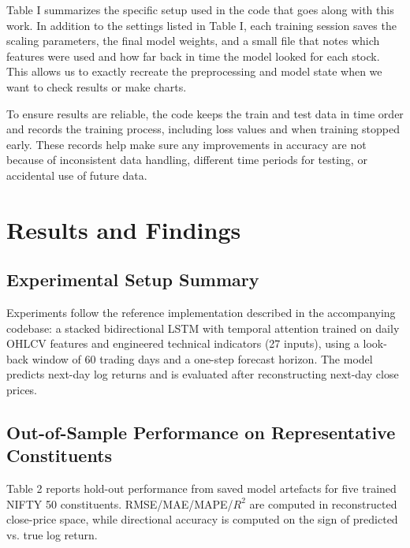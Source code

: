 \documentclass[conference]{IEEEtran}
\begin{document}
Table I summarizes the specific setup used in the code that goes along with this work. In addition to the settings listed in Table I, each training session saves the scaling parameters, the final model weights, and a small file that notes which features were used and how far back in time the model looked for each stock. This allows us to exactly recreate the preprocessing and model state when we want to check results or make charts.

To ensure results are reliable, the code keeps the train and test data in time order and records the training process, including loss values and when training stopped early. These records help make sure any improvements in accuracy are not because of inconsistent data handling, different time periods for testing, or accidental use of future data.

\FloatBarrier

\section{Results and Findings}

\FloatBarrier

\subsection{Experimental Setup Summary}

Experiments follow the reference implementation described in the accompanying codebase: a stacked bidirectional LSTM with temporal attention trained on daily OHLCV features and engineered technical indicators (27 inputs), using a look-back window of 60 trading days and a one-step forecast horizon. The model predicts next-day log returns and is evaluated after reconstructing next-day close prices.

\subsection{Out-of-Sample Performance on Representative Constituents}

Table 2 reports hold-out performance from saved model artefacts for five trained NIFTY 50 constituents. RMSE/MAE/MAPE/$R^2$ are computed in reconstructed close-price space, while directional accuracy is computed on the sign of predicted vs. true log return.
\end{document}
